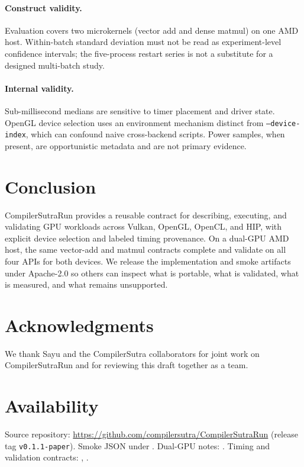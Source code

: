 \documentclass[11pt,a4paper]{article}
\begin{document}
\paragraph{Construct validity.}
Evaluation covers two microkernels (vector add and dense matmul) on one AMD
host. Within-batch standard deviation must not be read as experiment-level
confidence intervals; the five-process restart series is not a substitute for
a designed multi-batch study.

\paragraph{Internal validity.}
Sub-millisecond medians are sensitive to timer placement and driver state.
OpenGL device selection uses an environment mechanism distinct from
\texttt{--device-index}, which can confound naive cross-backend scripts.
Power samples, when present, are opportunistic metadata and are not primary
evidence.

\section{Conclusion}
\label{sec:conc}

CompilerSutraRun provides a reusable contract for describing, executing, and
validating GPU workloads across Vulkan, OpenGL, OpenCL, and HIP, with explicit
device selection and labeled timing provenance. On a dual-GPU AMD host, the
same vector-add and matmul contracts complete and validate on all four APIs
for both devices. We release the implementation and smoke artifacts under
Apache-2.0 so others can inspect what is portable, what is validated, what is
measured, and what remains unsupported.

\section*{Acknowledgments}
We thank Sayu and the CompilerSutra collaborators for joint work on
CompilerSutraRun and for reviewing this draft together as a team.

\section*{Availability}
Source repository:
\url{https://github.com/compilersutra/CompilerSutraRun}
(release tag \texttt{v0.1.1-paper}).
Smoke JSON under .
Dual-GPU notes: .
Timing and validation contracts:
, .



\end{document}
